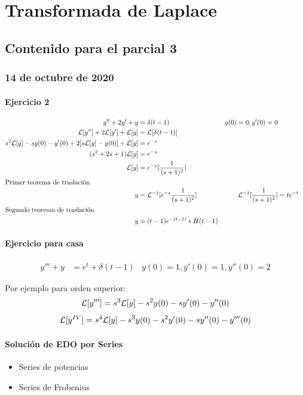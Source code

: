 \documentclass[11pt,fleqn]{book} %
\begin{document}
\part{Transformada de Laplace}



\chapter{Contenido para el parcial 3}
\section{14 de octubre de 2020}

\subsection{Ejercicio 2}
\begin{align}
y''+2y'+y &= \delta(t-1) & y(0) = 0, y'(0) = 0\\
\mathcal{L}[y'']+2\mathcal{L}[y']+\mathcal{L}[y]&= \mathcal{L}[\delta(t-1)]\\
s^2 \mathcal{L}[y]-sy(0)-y'(0)+2[s\mathcal{L}[y]-y(0)]+\mathcal{L}[y]&=e^{-s}\\
(s^2 +2s+1)\mathcal{L}[y]&= e^{-s}\\
\mathcal{L}[y]&=e^{-s}(\frac{1}{(s+1)^2})\\
\intertext{Primer teorema de traslación}
y&=\mathcal{L}^{-1}[e^{-s}\frac{1}{(s+1)^{2}}]& \mathcal{L}^{-1}[\frac{1}{(s+1)^2}]&= te^{-t}\\
\intertext{Segundo teorema de traslación}
y&=(t-1)e^{-(t-1)}*H(t-1)
\end{align}

\subsection{Ejercicio para casa}
\begin{align}
    y'''+y &= e^t +\delta(t-1) & y(0)=1,y'(0)=1,y''(0)=2
\end{align}

Por ejemplo para orden superior: 
$$\mathcal{L}[y''']=s^3 \mathcal{L}[y]-s^2 y(0)-sy'(0)-y''(0)$$
$$\mathcal{L}[y^{IV}]=s^4\mathcal{L}[y]-s^3y(0)-s^2y'(0)-sy''(0)-y'''(0) $$

\subsection{Solución de EDO por Series}
\begin{itemize}
    \item Series de potencias
    \item Series de Frobenius 
\end{itemize}
\end{document}
